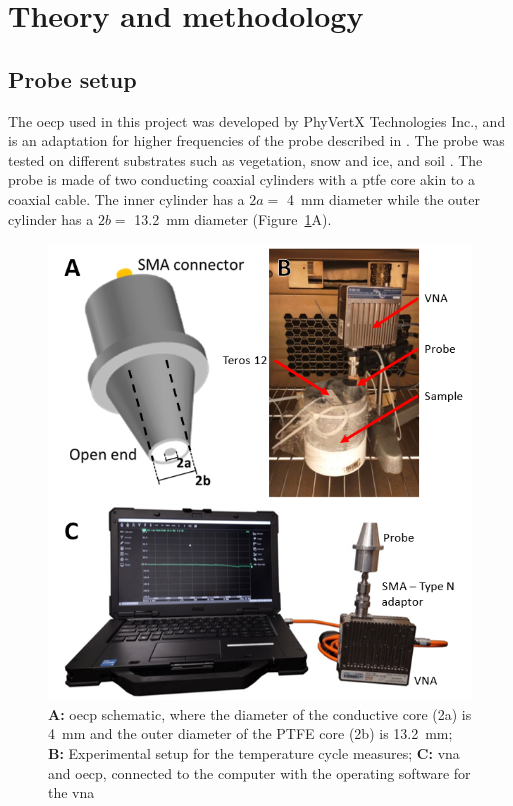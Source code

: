 \section{Theory and methodology}\label{sec:metho}

\subsection{Probe setup}\label{subsec:metho-mats}
The \ac{oecp} used in this project was developed by PhyVertX Technologies Inc., and is an adaptation for higher frequencies of the probe described in \parencite{Filali2008}. 
The probe was tested on different substrates such as vegetation, snow and ice, and soil \parencite{Mavrovic2018,Mavrovic2020,Mavrovic2021}.
The probe is made of two conducting coaxial cylinders with a \ac{ptfe} core akin to a coaxial cable.
The inner cylinder has a \(2a =\) \SI{4}{\mm} diameter while the outer cylinder has a \(2b =\) \SI{13.2}{\mm} diameter (Figure~\ref{fig:probe-scheme}A).

\begin{figure}[ht!]
    \centering
    \includegraphics[width=0.9\columnwidth]{Images/method-pic.png}
    \caption[]{\textbf{A:} \ac{oecp} schematic, where the diameter of the conductive core (2a) is \qty{4}{\milli\meter} and the outer diameter of the PTFE core (2b) is \qty{13.2}{\milli\meter}; \textbf{B:} Experimental setup for the temperature cycle measures; \textbf{C:} \ac{vna} and \ac{oecp}, connected to the computer with the operating software for the \ac{vna}}\label{fig:probe-scheme}
\end{figure}


